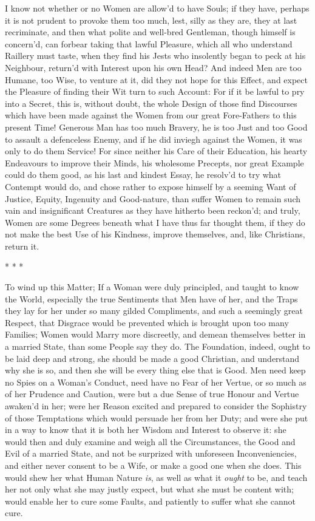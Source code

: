 I know not whether or no Women are allow'd to have Souls; if they
have, perhaps it is not prudent to provoke them too much, lest, silly
as they are, they at last recriminate, and then what polite and
well-bred Gentleman, though himself is concern'd, can forbear taking
that lawful Pleasure, which all who understand Raillery must taste,
when they find his Jests who insolently began to peck at his
Neighbour, return'd with Interest upon his own Head? And indeed Men
are too Humane, too Wise, to venture at it, did they not hope for this
Effect, and expect the Pleasure of finding their Wit turn to such
Account: For if it be lawful to pry into a Secret,  this is,
without doubt, the whole Design of those find Discourses which have
been made against the Women from our great Fore-Fathers to this
present Time! Generous Man has too much Bravery, he is too Just and
too Good to assault a defenceless Enemy, and if he did inviegh against
the Women, it was only to do them Service! For since neither his Care
of their Education, his hearty Endeavours to improve their Minds, his
wholesome Precepts, nor great Example could do them good, as his last
and kindest Essay, he resolv'd to try what Contempt would do, and
chose rather to expose himself by a seeming Want of Justice, Equity,
Ingenuity and Good-nature, than suffer Women to remain such vain and
insignificant Creatures as they have hitherto been reckon'd; and
truly, Women are some Degrees beneath what I have thus far thought
them, if they do not make the best Use of his Kindness, improve
themselves, and, like Christians, return it.

\begin{center}* * *\end{center}

To wind up this Matter; If a Woman were duly principled, and
taught to know the World, especially the true Sentiments that Men have
of her, and the Traps they lay for her under so many gilded
Compliments, and such a  seemingly great Respect, that
Disgrace would be prevented which is brought upon too many Families;
Women would Marry more discreetly, and demean themselves better in a
married State, than some People say they do. The Foundation, indeed,
ought to be laid deep and strong, she should be made a good Christian,
and understand why she is so, and then she will be every thing else
that is Good. Men need keep no Spies on a Woman's Conduct, need have
no Fear of her Vertue, or so much as of her Prudence and Caution, were
but a due Sense of true Honour and Vertue awaken'd in her; were her
Reason excited and prepared to consider the Sophistry of those
Temptations which would persuade her from her Duty; and were she put
in a way to know that it is both her Wisdom and Interest to observe
it: she would then and duly examine and weigh all the Circumstances,
the Good and Evil of a married State, and not be surprized with
unforeseen Inconveniencies, and either never consent to be a Wife, or
 make a good one when she does. This would shew her what
Human Nature \textit{is}, as well as what it \textit{ought} to be, and
teach her not only what she may justly expect, but what she must be
content with; would enable her to cure some Faults, and patiently to
suffer what she cannot cure.

